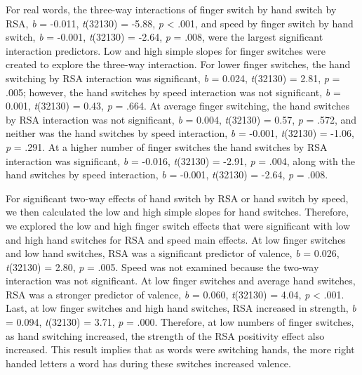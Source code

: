 \documentclass[english,man]{apa6}
\theoremstyle{definition}
\theoremstyle{definition}
\theoremstyle{definition}
\theoremstyle{remark}
\begin{document}
For real words, the three-way interactions of finger switch by hand
switch by RSA, \emph{b} = -0.011, \emph{t}(32130) = -5.88, \emph{p}
\textless{} .001, and speed by finger switch by hand switch, \emph{b} =
-0.001, \emph{t}(32130) = -2.64, \emph{p} = .008, were the largest
significant interaction predictors. Low and high simple slopes for
finger switches were created to explore the three-way interaction. For
lower finger switches, the hand switching by RSA interaction was
significant, \emph{b} = 0.024, \emph{t}(32130) = 2.81, \emph{p} = .005;
however, the hand switches by speed interaction was not significant,
\emph{b} = 0.001, \emph{t}(32130) = 0.43, \emph{p} = .664. At average
finger switching, the hand switches by RSA interaction was not
significant, \emph{b} = 0.004, \emph{t}(32130) = 0.57, \emph{p} = .572,
and neither was the hand switches by speed interaction, \emph{b} =
-0.001, \emph{t}(32130) = -1.06, \emph{p} = .291. At a higher number of
finger switches the hand switches by RSA interaction was significant,
\emph{b} = -0.016, \emph{t}(32130) = -2.91, \emph{p} = .004, along with
the hand switches by speed interaction, \emph{b} = -0.001,
\emph{t}(32130) = -2.64, \emph{p} = .008.

For significant two-way effects of hand switch by RSA or hand switch by
speed, we then calculated the low and high simple slopes for hand
switches. Therefore, we explored the low and high finger switch effects
that were significant with low and high hand switches for RSA and speed
main effects. At low finger switches and low hand switches, RSA was a
significant predictor of valence, \emph{b} = 0.026, \emph{t}(32130) =
2.80, \emph{p} = .005. Speed was not examined because the two-way
interaction was not significant. At low finger switches and average hand
switches, RSA was a stronger predictor of valence, \emph{b} = 0.060,
\emph{t}(32130) = 4.04, \emph{p} \textless{} .001. Last, at low finger
switches and high hand switches, RSA increased in strength, \emph{b} =
0.094, \emph{t}(32130) = 3.71, \emph{p} = .000. Therefore, at low
numbers of finger switches, as hand switching increased, the strength of
the RSA positivity effect also increased. This result implies that as
words were switching hands, the more right handed letters a word has
during these switches increased valence.
\end{document}
